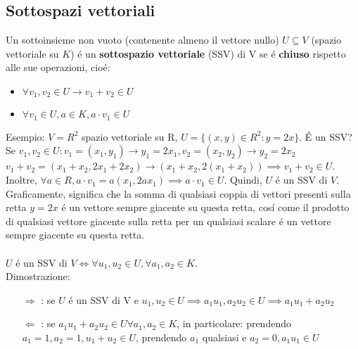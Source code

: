 \documentclass{article}
\begin{document}
\subsection{Sottospazi vettoriali}
Un sottoinsieme non vuoto (contenente almeno il vettore nullo) $U \subseteq V$ (spazio vettoriale su $K$) é un \textbf{sottospazio vettoriale} (SSV) di V se é \textbf{chiuso} rispetto alle sue operazioni, cioé:
\begin{itemize}
	\item $\forall v_1, v_2 \in U \rightarrow v_1 + v_2 \in U$
	\item $\forall v_1 \in U, a \in K, a \cdot v_1 \in U$
\end{itemize}
Esempio: $V = R^2$ spazio vettoriale su R, $U = \{(x,y) \in R^2 : y = 2x\}$. É un SSV?\\
Se $v_1, v_2 \in U: v_1 = (x_1, y_1) \rightarrow y_1 = 2x_1, v_2 = (x_2, y_2) \rightarrow y_2 = 2x_2$\\
$v_1 + v_2 = (x_1 + x_2, 2x_1 + 2x_2) \rightarrow (x_1 + x_2, 2(x_1 + x_2)) \implies v_1 + v_2 \in U$. Inoltre, $\forall a \in R, a \cdot v_1 = a(x_1, 2ax_1) \implies a \cdot v_1 \in U$. Quindi, $U$ é un SSV di $V$.\\
Graficamente, significa che la somma di qualsiasi coppia di vettori presenti sulla retta $y=2x$ é un vettore sempre giacente su questa retta, cosí come il prodotto di qualsiasi vettore giacente sulla retta per un qualsiasi scalare é un vettore sempre giacente su questa retta.\\\\
$U$ é un SSV di $V \iff \forall u_1, u_2 \in U, \forall a_1, a_2 \in K$.\\
Dimostrazione:
\begin{itemize}
	\item[$\Rightarrow$]: se $U$ é un SSV di V e $u_1, u_2 \in U \implies a_1 u_1, a_2 u_2 \in U \implies a_1 u_1 + a_2 u_2$
	\item[$\Leftarrow$]: se $a_1 u_1 + a_2 u_2 \in U \forall a_1, a_2 \in K$, in particolare: prendendo $a_1 = 1, a_2 = 1, u_1 + u_2 \in U$, prendendo $a_1$ qualsiasi e $a_2 = 0, a_1 u_1 \in U$
\end{itemize}
\end{document}

